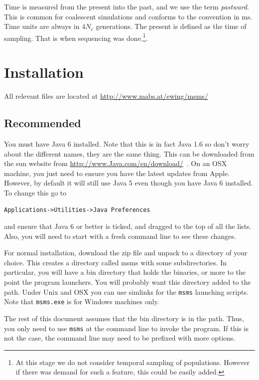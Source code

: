 \documentclass{article}
\begin{document}
Time is measured from the present into the past, and we use the term {\it
pastward}.  This is common for coalescent simulations and conforms to the
convention in ms.  Time units are always in $4N_e$ generations. The present is defined as the
time of sampling. That is when sequencing was done.\footnote{At this stage we do
not consider temporal sampling
  of populations. However if there was demand for such a feature, this could be
  easily added.}. 
  

\section{Installation}
All relevant files are located at \url{http://www.mabs.at/ewing/msms/}\

\subsection{Recommended}

You must have Java 6 installed. Note that this is in fact Java 1.6 so don't
worry about the different names, they are the same thing. This can be
downloaded from the sun website from \url{http://www.Java.com/en/download/}\ .
On an OSX machine, you just need to ensure you have the latest updates from Apple.
However, by default it will still use Java 5 even though you have Java 6
installed. To change this go to
\begin{verbatim}
Applications->Utilities->Java Preferences
\end{verbatim}
and ensure that Java 6 or better is ticked, and dragged to the top of all the
lists. Also, you will need to start with a fresh command line to see these
changes.

For normal installation, download the zip file and unpack to a directory of your
choice. This creates a directory called msms with some subdirectories. In
particular, you will have a bin directory that holds the binaries, or more to the
point the program launchers. You will probably want this directory added to the
path. Under Unix and OSX you can use simlinks for the {\tt msms} launching
scripts. Note that {\tt msms.exe} is for Windows machines only. 

The rest of this document assumes that the bin directory is in the path. Thus,
you only need to use {\tt msms} at the command line to invoke the program. If
this is not the case, the command line may need to be prefixed with more
options. 
\end{document}

